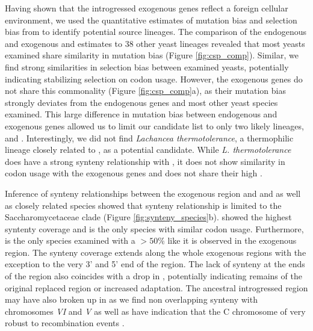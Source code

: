 \documentclass[12pt]{article}
\begin{document}
Having shown that the introgressed exogenous genes reflect a foreign cellular environment, we used the quantitative estimates of mutation bias \DM and selection bias \DE from \ROC to identify potential source lineages.
The comparison of the endogenous and exogenous \DM and \DE estimates to 38 other yeast lineages revealed that most yeasts examined share similarity in mutation bias (Figure \ref{fig:csp_comp}).
Similar, we find strong similarities in selection bias between examined yeasts, potentially indicating stabilizing selection on codon usage.
However, the exogenous genes do not share this commonality (Figure \ref{fig:csp_comp}a), as their mutation bias strongly deviates from the endogenous genes and most other yeast species examined. 
This large difference in mutation bias between endogenous and exogenous genes allowed us to limit our candidate list to only two likely lineages, \dubl and \gossypii.
Interestingly, we did not find \emph{Lachancea thermotolerance}, a thermophilic lineage closely related to \kluyveri, as a potential candidate.
While \emph{L. thermotolerance} does have a strong synteny relationship with \kluyveri, it does not show similarity in codon usage with the exogenous genes and does not share their high \GC.

Inference of synteny relationships between the exogenous region and \dubl and \gossypii as well as closely related species showed that synteny relationship is limited to the Saccharomycetaceae clade (Figure \ref{fig:synteny_species}b).
\gossypii showed the highest syntenty coverage and is the only species with similar codon usage.
Furthermore, \gossypii is the only species examined with a \GC $> 50 \%$ like it is observed in the exogenous region.
The synteny coverage extends along the whole exogenous regions with the exception to the very 3' and 5' end of the region. 
The lack of synteny at the ends of the region also coincides with a drop in \GC, potentially indicating remains of the original replaced region or increased adaptation.
The ancestral introgressed region may have also broken up in \gossypii as we find non overlapping synteny with chromosomes \emph{VI} and \emph{V} as well as have indication that the C chromosome of \kluyveri very robust to recombination events \citep{payen2009, vakirlis2016}. 
\end{document}
